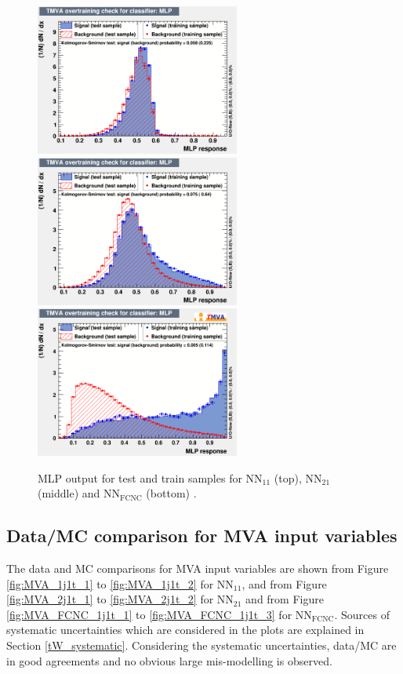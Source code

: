 \begin{figure}[ht]
  \begin{center}
      \includegraphics[width=0.6\textwidth]{figures/tW/fig/MVA/MLP_1j1b/MLP.png}
      \includegraphics[width=0.6\textwidth]{figures/tW/fig/MVA/MLP_2j1b/MLP.png}
      \includegraphics[width=0.6\textwidth]{figures/tW/fig/MVA/MLP_FCNC/MLP.png}
    \caption{MLP output for test and train samples for NN$_{11}$ (top), NN$_{21}$ (middle) and NN$_{\text{FCNC}}$ (bottom) \cite{CMS-AN-2017-132}.}
    \label{fig:MLP_response}
  \end{center}
\end{figure}




\subsection{Data/MC comparison for MVA input variables}
\label{MVA_input_variables}
The data and MC comparisons for MVA input variables are shown from Figure \ref{fig:MVA_1j1t_1} to \ref{fig:MVA_1j1t_2} for NN$_{11}$, and from Figure \ref{fig:MVA_2j1t_1} to \ref{fig:MVA_2j1t_2} for NN$_{21}$ and from Figure \ref{fig:MVA_FCNC_1j1t_1} to \ref{fig:MVA_FCNC_1j1t_3} for NN$_{\text{FCNC}}$.
Sources of systematic uncertainties which are considered in the plots are explained in Section \ref{tW_systematic}.
Considering the systematic uncertainties, data/MC are in good agreements and no obvious large mis-modelling is observed.


